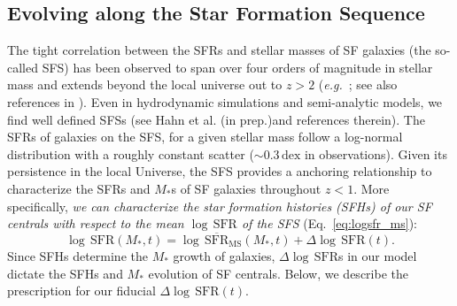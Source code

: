\documentclass[12pt, letterpaper, preprint, tighten]{aastex}
\newcommand{\beq}{\begin{equation}}
\newcommand{\eeq}{\end{equation}}
\newcommand{\logsfr}{\log \, \mathrm{SFR}}
\newcommand{\hahngmm}{Hahn et al. (in prep.)}
\begin{document}
\subsection{Evolving along the Star Formation Sequence} \label{sec:modelevol} 
The tight correlation between the SFRs and stellar masses of SF 
galaxies (the so-called SFS) has been observed to span over four 
orders of magnitude in stellar mass and extends beyond the local 
universe out to $z > 2$ 
(\emph{e.g.}~\citealt{noeske2007,daddi2007,elbaz2007,salim2007,santini2009,karim2011,whitaker2012,moustakas2013,lee2015}; see also references in \citealt{speagle2014}). 
Even in hydrodynamic simulations and semi-analytic models, we find 
well defined SFSs (see \hahngmm and references therein). The SFRs 
of galaxies on the SFS, for a given stellar mass follow a log-normal 
distribution with a roughly constant scatter ($\sim0.3\,\mathrm{dex}$ 
in observations).  %
Given its persistence in the local Universe, the SFS provides a 
anchoring relationship to characterize the SFRs and $M_*$s of SF 
galaxies throughout $z < 1$. More specifically, \emph{we can characterize 
the star formation histories (SFHs) of our SF centrals with respect 
to the mean $\logsfr$ of the SFS} (Eq.~\ref{eq:logsfr_ms}):
\beq \label{eq:logsfr_sf} 
\logsfr(M_*, t) = \log\,\overline{\mathrm{SFR}}_\mathrm{MS}(M_*, t) + \Delta \logsfr(t).
\eeq
Since SFHs determine the $M_*$ growth of galaxies, $\Delta \logsfr$s
in our model dictate the SFHs and $M_*$ evolution of SF centrals. 
Below, we describe the prescription for our fiducial $\Delta \logsfr(t)$.
\end{document}
